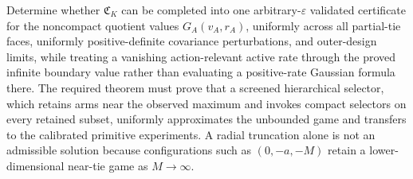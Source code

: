 Determine whether \(\mathfrak C_K\) can be completed into one arbitrary-\(\varepsilon\) validated certificate for the noncompact quotient values \(G_A(v_A,r_A)\), uniformly across all partial-tie faces, uniformly positive-definite covariance perturbations, and outer-design limits, while treating a vanishing action-relevant active rate through the proved infinite boundary value rather than evaluating a positive-rate Gaussian formula there.  The required theorem must prove that a screened hierarchical selector, which retains arms near the observed maximum and invokes compact selectors on every retained subset, uniformly approximates the unbounded game and transfers to the calibrated primitive experiments.  A radial truncation alone is not an admissible solution because configurations such as \((0,-a,-M)\) retain a lower-dimensional near-tie game as \(M\to\infty\).